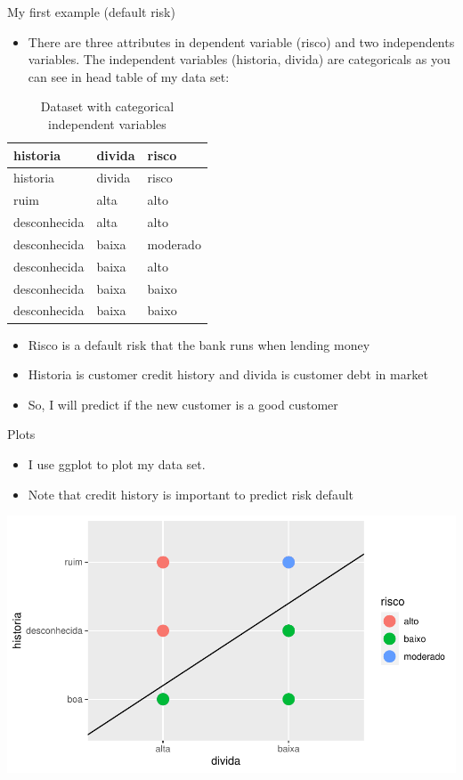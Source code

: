 \documentclass[
  10pt,
  ignorenonframetext,
]{beamer}
\providecommand{\tightlist}{%
  \setlength{\itemsep}{0pt}\setlength{\parskip}{0pt}}
\begin{document}
\begin{frame}{My first example (default risk)}
\protect\hypertarget{my-first-example-default-risk}{}

\begin{itemize}
\tightlist
\item
  There are three attributes in dependent variable (risco) and two
  independents variables. The independent variables (historia, divida)
  are categoricals as you can see in head table of my data set:
\end{itemize}

\begin{longtable}[]{@{}lll@{}}
\caption{Dataset with categorical independent variables}\tabularnewline
\toprule
historia & divida & risco\tabularnewline
\midrule
\endfirsthead
\toprule
historia & divida & risco\tabularnewline
\midrule
\endhead
ruim & alta & alto\tabularnewline
desconhecida & alta & alto\tabularnewline
desconhecida & baixa & moderado\tabularnewline
desconhecida & baixa & alto\tabularnewline
desconhecida & baixa & baixo\tabularnewline
desconhecida & baixa & baixo\tabularnewline
\bottomrule
\end{longtable}

\begin{itemize}
\tightlist
\item
  Risco is a default risk that the bank runs when lending money
\item
  Historia is customer credit history and divida is customer debt in
  market\\
\item
  So, I will predict if the new customer is a good customer
\end{itemize}

\end{frame}

\begin{frame}{Plots}
\protect\hypertarget{plots}{}

\begin{itemize}
\tightlist
\item
  I use ggplot to plot my data set.
\item
  Note that credit history is important to predict risk default
\end{itemize}

\includegraphics{MJ_Ribeiro_files/figure-beamer/unnamed-chunk-5-1.pdf}

\end{frame}
\end{document}

